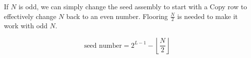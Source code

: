 \documentclass[11pt]{article}
\begin{document}
If $N$ is odd, we can simply change the seed assembly to start with a Copy row to effectively change
$N$ back to an even number. Flooring $\frac{N}{2}$ is needed to make it work with odd $N$.

\begin{equation}
    \text{seed number} = 2^{L - 1} - \left\lfloor \frac{N}{2} \right\rfloor
    \label{eq:exs-3_seed-number}
\end{equation}
\end{document}
